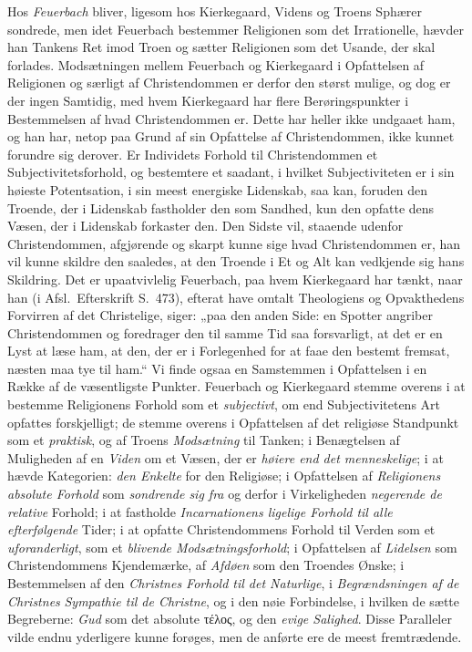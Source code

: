 \documentclass[12pt,a4paper]{book}
\newcommand{\opage}[1]{\marginnote{\footnotesize\textit{[#1]}}}
\begin{document}
Hos \emph{Feuerbach} bliver, ligesom hos Kierkegaard, Videns og Troens
Sphærer sondrede, men idet Feuerbach bestemmer Religionen som det
Irrationelle, hævder han Tankens Ret imod Troen og sætter Religionen
som det Usande, der skal forlades. Modsætningen mellem Feuerbach og
Kierkegaard i Opfattelsen af Religionen og særligt af Christendommen
er derfor den størst mulige, og dog er der ingen Samtidig, med hvem
Kierkegaard har flere Berøringspunkter i Bestemmelsen af hvad
Christendommen \opage{125}er. Dette har heller ikke undgaaet ham, og han har,
netop paa Grund af sin Opfattelse af Christendommen, ikke kunnet
forundre sig derover. Er Individets Forhold til Christendommen et
Subjectivitetsforhold, og bestemtere et saadant, i hvilket
Subjectiviteten er i sin høieste Potentsation, i sin meest energiske
Lidenskab, saa kan, foruden den Troende, der i Lidenskab fastholder den
som Sandhed, kun den opfatte dens Væsen, der i Lidenskab forkaster
den. Den Sidste vil, staaende udenfor Christendommen, afgjørende og
skarpt kunne sige hvad Christendommen er, han vil kunne skildre den
saaledes, at den Troende i Et og Alt kan vedkjende sig hans Skildring.
Det er upaatvivlelig Feuerbach, paa hvem Kierkegaard har tænkt, naar
han (i Afsl.\ Efterskrift S.\ 473), efterat have omtalt Theologiens og
Opvakthedens Forvirren af det Christelige, siger: „paa den anden Side:
en Spotter angriber Christendommen og foredrager den til samme Tid saa
forsvarligt, at det er en Lyst at læse ham, at den, der er i
Forlegenhed for at faae den bestemt fremsat, næsten maa tye til
ham.“ Vi finde ogsaa en Samstemmen i Opfattelsen i en Række af de
væsentligste Punkter. Feuerbach og Kierkegaard stemme overens i at
bestemme Religionens Forhold som et \emph{subjectivt}, om end Subjectivitetens
Art opfattes forskjelligt; de stemme overens i Opfattelsen af det
religiøse Standpunkt som et \emph{praktisk}, og af Troens \emph{Modsætning} til
Tanken; i Benægtelsen af Muligheden af en \emph{Viden} om et Væsen, der er \emph{høiere end det menneskelige}; i at hævde Kategorien: \emph{den Enkelte} for
den Religiøse; i Opfattelsen af \emph{Religionens absolute Forhold} som \emph{sondrende sig fra} og derfor i Virkeligheden \emph{negerende de relative} Forhold; i at fastholde \emph{Incarnationens ligelige Forhold til alle efterfølgende} Tider; i at opfatte Christendommens Forhold til Verden
som et \emph{uforanderligt}, som et \emph{blivende Modsætningsforhold}; i
Opfattelsen af \emph{Lidelsen} som Christendommens Kjendemærke, af \emph{Afdøen}
som den Troendes Ønske; i Bestemmelsen af den \emph{Christnes Forhold til det Naturlige}, i \emph{Begrændsningen af de Christ\opage{126}nes} \emph{Sympathie til de Christne}, og i den nøie Forbindelse, i hvilken de sætte Begreberne: \emph{Gud} som det absolute τέλος, og den \emph{evige Salighed}. Disse Paralleler
vilde endnu yderligere kunne forøges, men de anførte ere de meest
fremtrædende.
\end{document}
